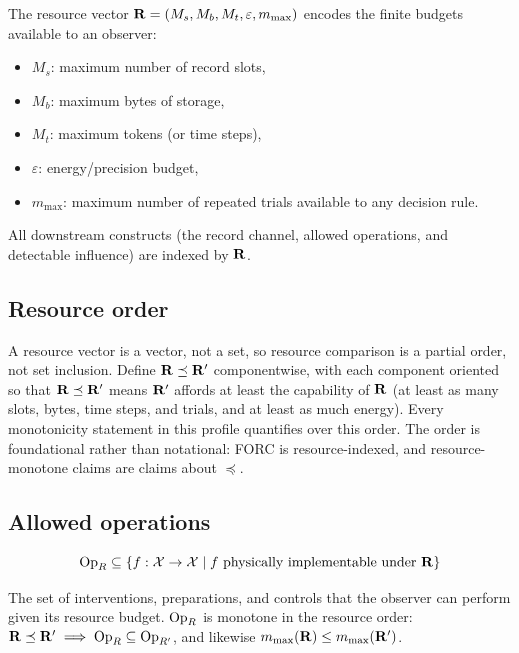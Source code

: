 The resource vector
$\mathbf{R} = (M_s, M_b, M_t, \varepsilon, m_{\max})$
encodes the finite budgets available to an observer:
\begin{itemize}
  \item $M_s$: maximum number of record slots,
  \item $M_b$: maximum bytes of storage,
  \item $M_t$: maximum tokens (or time steps),
  \item $\varepsilon$: energy/precision budget,
  \item $m_{\max}$: maximum number of repeated trials available to any
    decision rule.
\end{itemize}

All downstream constructs (the record channel, allowed operations, and
detectable influence) are indexed by $\mathbf{R}$.

\subsection{Resource order}

A resource vector is a vector, not a set, so resource comparison is a
partial order, not set inclusion.  Define
$\mathbf{R} \preceq \mathbf{R}'$ componentwise, with each component
oriented so that $\mathbf{R} \preceq \mathbf{R}'$ means
$\mathbf{R}'$ affords at least the capability of $\mathbf{R}$
(at least as many slots, bytes, time steps, and trials, and at least as
much energy).  Every monotonicity statement in this profile quantifies
over this order.  The order is foundational rather than notational:
FORC is resource-indexed, and resource-monotone claims are claims about
$\preceq$.

\subsection{Allowed operations}

\begin{equation}
  \mathrm{Op}_{R} \subseteq
    \{ f : \mathcal{X} \to \mathcal{X} \mid
       f \text{ physically implementable under } \mathbf{R} \}\label{eq:allowed-ops}
\end{equation}

The set of interventions, preparations, and controls that the observer can
perform given its resource budget.  $\mathrm{Op}_{R}$ is monotone in the
resource order:
$\mathbf{R} \preceq \mathbf{R}' \implies
 \mathrm{Op}_{R} \subseteq \mathrm{Op}_{R'}$, and likewise
$m_{\max}(\mathbf{R}) \le m_{\max}(\mathbf{R}')$.
